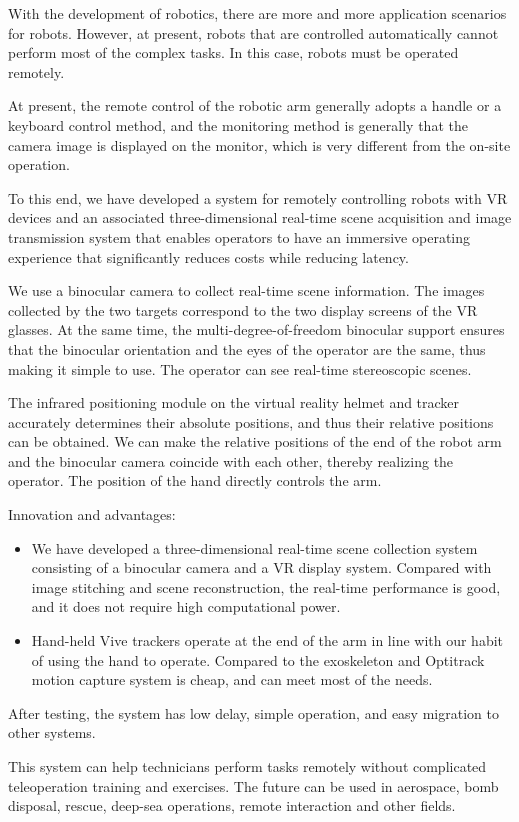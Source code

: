\begin{eabstract}
With the development of robotics, there are more and more application scenarios for robots. However, at present, robots that are controlled automatically cannot perform most of the complex tasks. In this case, robots must be operated remotely.

At present, the remote control of the robotic arm generally adopts a handle or a keyboard control method, and the monitoring method is generally that the camera image is displayed on the monitor, which is very different from the on-site operation.

To this end, we have developed a system for remotely controlling robots with VR devices and an associated three-dimensional real-time scene acquisition and image transmission system that enables operators to have an immersive operating experience that significantly reduces costs while reducing latency.

We use a binocular camera to collect real-time scene information. The images collected by the two targets correspond to the two display screens of the VR glasses. At the same time, the multi-degree-of-freedom binocular support ensures that the binocular orientation and the eyes of the operator are the same, thus making it simple to use. The operator can see real-time stereoscopic scenes.

The infrared positioning module on the virtual reality helmet and tracker accurately determines their absolute positions, and thus their relative positions can be obtained. We can make the relative positions of the end of the robot arm and the binocular camera coincide with each other, thereby realizing the operator. The position of the hand directly controls the arm.

\bigbreak
Innovation and advantages:
   \begin{itemize}
     \item We have developed a three-dimensional real-time scene collection system consisting of a binocular camera and a VR display system. Compared with image stitching and scene reconstruction, the real-time performance is good, and it does not require high computational power.
     \item Hand-held Vive trackers operate at the end of the arm in line with our habit of using the hand to operate. Compared to the exoskeleton and Optitrack motion capture system is cheap, and can meet most of the needs.
   \end{itemize}
   \bigbreak

After testing, the system has low delay, simple operation, and easy migration to other systems.

This system can help technicians perform tasks remotely without complicated teleoperation training and exercises. The future can be used in aerospace, bomb disposal, rescue, deep-sea operations, remote interaction and other fields.

\end{eabstract}


